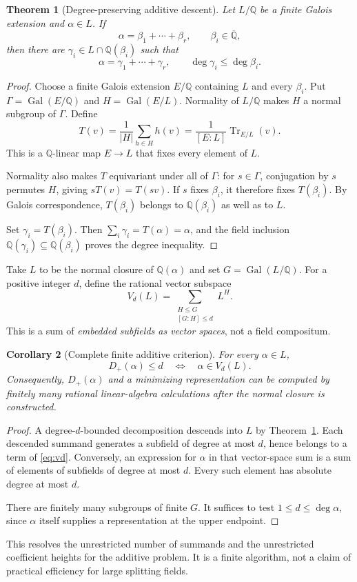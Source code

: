 \documentclass[11pt,a4paper]{article}
\newcommand{\Q}{\mathbb Q}
\newcommand{\Qbar}{\overline{\mathbb Q}}
\newcommand{\Gal}{\operatorname{Gal}}
\newcommand{\Tr}{\operatorname{Tr}}
\newcommand{\dplus}{D_{+}}
\newtheorem{theorem}{Theorem}[section]
\newtheorem{corollary}[theorem]{Corollary}
\theoremstyle{definition}
\theoremstyle{remark}
\begin{document}
\begin{theorem}[Degree-preserving additive descent]
\label{thm:trace}
Let $L/\Q$ be a finite Galois extension and $\alpha\in L$. If
\[
 \alpha=\beta_1+\cdots+\beta_r,\qquad \beta_i\in\Qbar,
\]
then there are $\gamma_i\in L\cap\Q(\beta_i)$ such that
\[
 \alpha=\gamma_1+\cdots+\gamma_r,\qquad
 \deg\gamma_i\leq\deg\beta_i.
\]
\end{theorem}
\begin{proof}
Choose a finite Galois extension $E/\Q$ containing $L$ and every $\beta_i$. Put $\Gamma=\Gal(E/\Q)$ and $H=\Gal(E/L)$. Normality of $L/\Q$ makes $H$ a normal subgroup of $\Gamma$. Define
\[
 T(v)=\frac1{|H|}\sum_{h\in H}h(v)=\frac1{[E:L]}\Tr_{E/L}(v).
\]
This is a $\Q$-linear map $E\to L$ that fixes every element of $L$.

Normality also makes $T$ equivariant under all of $\Gamma$: for $s\in\Gamma$, conjugation by $s$ permutes $H$, giving $sT(v)=T(sv)$. If $s$ fixes $\beta_i$, it therefore fixes $T(\beta_i)$. By Galois correspondence, $T(\beta_i)$ belongs to $\Q(\beta_i)$ as well as to $L$.

Set $\gamma_i=T(\beta_i)$. Then
$\sum_i\gamma_i=T(\alpha)=\alpha$, and the field inclusion
$\Q(\gamma_i)\subseteq\Q(\beta_i)$ proves the degree inequality.
\end{proof}

Take $L$ to be the normal closure of $\Q(\alpha)$ and set $G=\Gal(L/\Q)$. For a positive integer $d$, define the rational vector subspace
\begin{equation}
 V_d(L)=\sum_{\substack{H\leq G\\{}[G:H]\leq d}}L^H.
 \label{eq:vd}
\end{equation}
This is a sum of \emph{embedded subfields as vector spaces}, not a field compositum.

\begin{corollary}[Complete finite additive criterion]
\label{cor:additivecriterion}
For every $\alpha\in L$,
\[
 \dplus(\alpha)\leq d\quad\Longleftrightarrow\quad\alpha\in V_d(L).
\]
Consequently, $\dplus(\alpha)$ and a minimizing representation can be computed by finitely many rational linear-algebra calculations after the normal closure is constructed.
\end{corollary}
\begin{proof}
A degree-$d$-bounded decomposition descends into $L$ by Theorem~\ref{thm:trace}. Each descended summand generates a subfield of degree at most $d$, hence belongs to a term of \eqref{eq:vd}. Conversely, an expression for $\alpha$ in that vector-space sum is a sum of elements of subfields of degree at most $d$. Every such element has absolute degree at most $d$.

There are finitely many subgroups of finite $G$. It suffices to test $1\leq d\leq\deg\alpha$, since $\alpha$ itself supplies a representation at the upper endpoint.
\end{proof}
This resolves the unrestricted number of summands and the unrestricted coefficient heights for the additive problem. It is a finite algorithm, not a claim of practical efficiency for large splitting fields.
\end{document}
